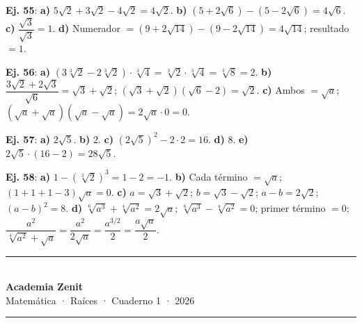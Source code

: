 \documentclass[11pt, letterpaper]{article}
\begin{document}
\begin{tcolorbox}[answerbox, title={Bloque O — Operatoria combinada}]

\noindent\textbf{Ej. 55}: \textbf{a)} $5\sqrt{2}+3\sqrt{2}-4\sqrt{2}=4\sqrt{2}$. \textbf{b)} $(5+2\sqrt{6})-(5-2\sqrt{6})=4\sqrt{6}$. \textbf{c)} $\dfrac{\sqrt{3}}{\sqrt{3}}=1$. \textbf{d)} Numerador $=(9+2\sqrt{14})-(9-2\sqrt{14})=4\sqrt{14}$;\; resultado $=1$.

\medskip

\noindent\textbf{Ej. 56}: \textbf{a)} $(3\sqrt[3]{2}-2\sqrt[3]{2})\cdot\sqrt[3]{4}=\sqrt[3]{2}\cdot\sqrt[3]{4}=\sqrt[3]{8}=2$. \textbf{b)} $\dfrac{3\sqrt{2}+2\sqrt{3}}{\sqrt{6}}=\sqrt{3}+\sqrt{2}$;\; $(\sqrt{3}+\sqrt{2})(\sqrt{6}-2)=\sqrt{2}$. \textbf{c)} Ambos $=\sqrt{a}$;\; $(\sqrt{a}+\sqrt{a})(\sqrt{a}-\sqrt{a})=2\sqrt{a}\cdot0=0$.

\medskip

\noindent\textbf{Ej. 57}: \textbf{a)} $2\sqrt{5}$. \textbf{b)} $2$. \textbf{c)} $(2\sqrt{5})^2-2\cdot2=16$. \textbf{d)} $8$. \textbf{e)} $2\sqrt{5}\cdot(16-2)=28\sqrt{5}$.

\medskip

\noindent\textbf{Ej. 58}: \textbf{a)} $1-(\sqrt[3]{2})^3=1-2=-1$. \textbf{b)} Cada término $=\sqrt{a}$;\; $(1+1+1-3)\sqrt{a}=0$. \textbf{c)} $a=\sqrt{3}+\sqrt{2}$;\; $b=\sqrt{3}-\sqrt{2}$;\; $a-b=2\sqrt{2}$;\; $(a-b)^2=8$. \textbf{d)} $\sqrt[6]{a^3}+\sqrt[4]{a^2}=2\sqrt{a}$;\; $\sqrt[6]{a^3}-\sqrt[4]{a^2}=0$;\; primer término $=0$;\; $\dfrac{a^2}{\sqrt[4]{a^2}+\sqrt{a}}=\dfrac{a^2}{2\sqrt{a}}=\dfrac{a^{3/2}}{2}=\dfrac{a\sqrt{a}}{2}$.
\end{tcolorbox}

\vspace{0.4cm}
\begin{center}
  \textcolor{zenitnavy}{\rule{0.6\linewidth}{0.8pt}}\\[0.4cm]
  {\large\bfseries\color{zenitnavy} Academia Zenit}\\[3pt]
  {\color{zenitgold} Matemática · Raíces · Cuaderno 1 · 2026}\\[4pt]
  \textcolor{zenitnavy}{\rule{0.6\linewidth}{0.8pt}}
\end{center}
\end{document}
